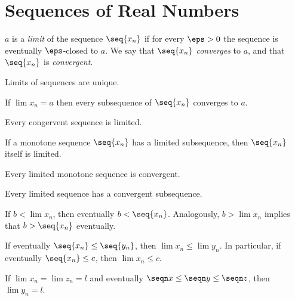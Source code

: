 \setcounter{section}{2}
\section{Sequences of Real Numbers}

\begin{definition}
	$a$ is a \emph{limit} of the sequence $\seq {x_n}$ if for every $\eps > 0$ the sequence is eventually $\eps$-closed to $a$.
	We say that $\seq{x_n}$ \emph{converges} to $a$, and that $\seq{x_n}$ is \emph{convergent}.
\end{definition}

\begin{theorem}
	Limits of sequences are unique.
\end{theorem}

\begin{theorem}
	If $\lim x_n = a$ then every subsequence of $\seq{x_n}$ converges to $a$.
\end{theorem}

\begin{theorem}
	Every congervent sequence is limited.
\end{theorem}

\begin{fact}
	If a monotone sequence $\seq{x_n}$ has a limited subsequence, then $\seq{x_n}$ itself is limited.
\end{fact}

\begin{theorem}
	Every limited monotone sequence is convergent.
\end{theorem}

\begin{corollary}
	Every limited sequence has a convergent subsequence.
\end{corollary}

\begin{theorem}
	If $b < \lim x_n$, then eventually $b < \seq{x_n}$. Analogously,
	$b > \lim x_n$ implies that $b > \seq{x_n}$ eventually.
\end{theorem}

\begin{corollary}
	If eventually $\seq{x_n} \le \seq{y_n}$, then $\lim x_n \le \lim y_n$. 
	In particular, if eventually $\seq{x_n} \le c$, then $\lim x_n \le c$.
\end{corollary}

\begin{theorem}
		If $\lim x_n = \lim z_n = l$ and eventually $\seqn x \le \seqn y \le \seqn z$, then $\lim y_n = l$.
\end{theorem}


